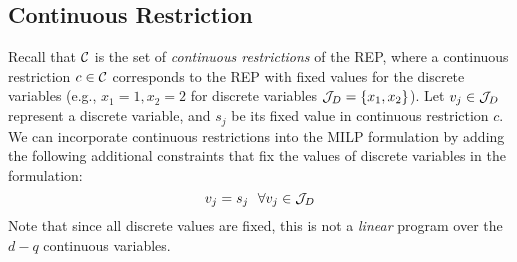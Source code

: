\subsection{Continuous Restriction}
Recall that ${\cal C}$ is the set of \emph{continuous restrictions} of the REP, where a continuous restriction $c \in {\cal C}$ corresponds to the REP with fixed values for the discrete variables (e.g., $x_1 = 1, x_2 = 2$ for discrete variables ${\cal J}_D = \{x_1, x_2\}$). Let $v_j \in {\cal J}_D$ represent a discrete variable, and $s_j$ be its fixed value in continuous restriction $c$. We can incorporate continuous restrictions into the MILP formulation by adding the following additional constraints that fix the values of discrete variables in the formulation:
$$
v_j = s_j ~~\forall v_j \in {\cal J}_D
$$
Note that since all discrete values are fixed, this is not a \emph{linear} program over the $d-q$ continuous variables.


